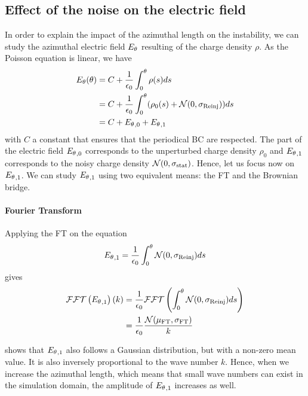   \subsection{Effect of the noise on the electric field}
    \label{sec-mathnoise}
    In order to explain the impact of the azimuthal length on the instability, we can study the azimuthal electric field ${E_{\theta}}$ resulting of the charge density $\rho$.
    As the Poisson equation is linear, we have
    \begin{align}
      {\ensuremath{E_{\theta}}}(\theta) &= C + \frac{1}{\epsilon_0} \int_0^{\theta} \rho(s) ds\\
                    &= C + \frac{1}{\epsilon_0} \int_0^{\theta} (\rho_0(s) + \mathcal{N}(0, \sigma_{\rm Reinj}) ) ds \\ 
                    &= C + {E_{\theta}}_{, 0} + {E_{\theta}}_{, 1}
    \end{align}
    with $C$ a constant that ensures that the periodical \ac{BC} are respected.
    The part of the electric field ${E_{\theta}}_{, 0}$ corresponds to the unperturbed charge density $\rho_0$ and ${E_{\theta}}_{, 1}$  corresponds to the noisy charge density $\mathcal{N}(0, \sigma_{\rm stat})$.
    Hence, let us focus now on ${E_{\theta}}_{, 1}$.
    We can study ${E_{\theta}}_{, 1}$ using two equivalent means\string: the \ac{FT} and the Brownian bridge.
    
    \paragraph{Fourier Transform \\}
      Applying the \ac{FT} on the equation
      \begin{equation} \label{eq-aziE1}
        {\ensuremath{E_{\theta}}}_{, 1} = \frac{1}{\epsilon_0} \int_0^{\theta}  \mathcal{N}(0, \sigma_{\rm Reinj}) ds
      \end{equation}
      gives    
      \begin{align}
         \mathcal{FFT} \left( {E_{\theta}}_{, 1} \right) (k) &= \frac{1}{\epsilon_0}  \mathcal{FFT} \left( \int_0^{\theta}  \mathcal{N}(0, \sigma_{\rm Reinj}) ds \right) \\
                                     &= \frac{1}{\epsilon_0} \frac{ \mathcal{N}(\mu_{\rm FT}, \sigma_{\rm FT})}{k} \label{eq-fft}
      \end{align}
      
       shows that ${E_{\theta}}_{, 1}$ also follows a Gaussian distribution, but with a non-zero mean value.
      It is also inversely proportional to the wave number $k$.
      Hence, when we increase the azimuthal length, which means that small wave numbers can exist in the simulation domain, the amplitude of ${E_{\theta}}_{, 1}$ increases as well.
      

